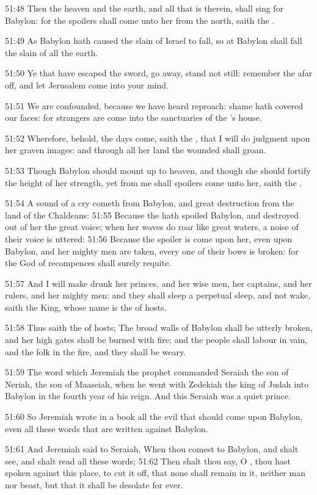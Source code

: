 51:48 Then the heaven and the earth, and all that is therein, shall
sing for Babylon: for the spoilers shall come unto her from the north,
saith the \LORD.

51:49 As Babylon hath caused the slain of Israel to fall, so at
Babylon shall fall the slain of all the earth.

51:50 Ye that have escaped the sword, go away, stand not still:
remember the \LORD afar off, and let Jerusalem come into your mind.

51:51 We are confounded, because we have heard reproach: shame hath
covered our faces: for strangers are come into the sanctuaries of the
\LORD's house.

51:52 Wherefore, behold, the days come, saith the \LORD, that I will do
judgment upon her graven images: and through all her land the wounded
shall groan.

51:53 Though Babylon should mount up to heaven, and though she should
fortify the height of her strength, yet from me shall spoilers come
unto her, saith the \LORD.

51:54 A sound of a cry cometh from Babylon, and great destruction from
the land of the Chaldeans: 51:55 Because the \LORD hath spoiled
Babylon, and destroyed out of her the great voice; when her waves do
roar like great waters, a noise of their voice is uttered: 51:56
Because the spoiler is come upon her, even upon Babylon, and her
mighty men are taken, every one of their bows is broken: for the \LORD
God of recompences shall surely requite.

51:57 And I will make drunk her princes, and her wise men, her
captains, and her rulers, and her mighty men: and they shall sleep a
perpetual sleep, and not wake, saith the King, whose name is the \LORD
of hosts.

51:58 Thus saith the \LORD of hosts; The broad walls of Babylon shall
be utterly broken, and her high gates shall be burned with fire; and
the people shall labour in vain, and the folk in the fire, and they
shall be weary.

51:59 The word which Jeremiah the prophet commanded Seraiah the son of
Neriah, the son of Maaseiah, when he went with Zedekiah the king of
Judah into Babylon in the fourth year of his reign. And this Seraiah
was a quiet prince.

51:60 So Jeremiah wrote in a book all the evil that should come upon
Babylon, even all these words that are written against Babylon.

51:61 And Jeremiah said to Seraiah, When thou comest to Babylon, and
shalt see, and shalt read all these words; 51:62 Then shalt thou say,
O \LORD, thou hast spoken against this place, to cut it off, that none
shall remain in it, neither man nor beast, but that it shall be
desolate for ever.

